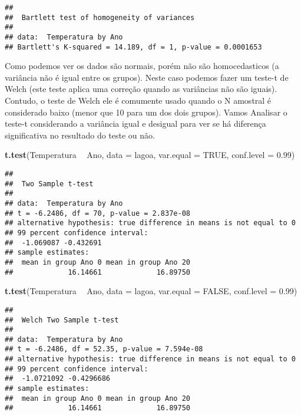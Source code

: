 \documentclass[14pt,titlepage, oneside, openany, a4paper]{book}
\newenvironment{Shaded}{\begin{snugshade}}{\end{snugshade}}
\newcommand{\DataTypeTok}[1]{\textcolor[rgb]{0.13,0.29,0.53}{#1}}
\newcommand{\FloatTok}[1]{\textcolor[rgb]{0.00,0.00,0.81}{#1}}
\newcommand{\KeywordTok}[1]{\textcolor[rgb]{0.13,0.29,0.53}{\textbf{#1}}}
\newcommand{\NormalTok}[1]{#1}
\newcommand{\OperatorTok}[1]{\textcolor[rgb]{0.81,0.36,0.00}{\textbf{#1}}}
\newcommand{\OtherTok}[1]{\textcolor[rgb]{0.56,0.35,0.01}{#1}}
\newcommand{\StringTok}[1]{\textcolor[rgb]{0.31,0.60,0.02}{#1}}
\begin{document}
\begin{verbatim}
## 
##  Bartlett test of homogeneity of variances
## 
## data:  Temperatura by Ano
## Bartlett's K-squared = 14.189, df = 1, p-value = 0.0001653
\end{verbatim}

Como podemos ver os dados são normais, porém não são homocedasticos (a variância não é igual entre os grupos). Neste caso podemos fazer um teste-t de Welch (este teste aplica uma correção quando as variâncias não são iguais). Contudo, o teste de Welch ele é comumente usado quando o N amostral é considerado baixo (menor que 10 para um dos dois grupos). Vamos Analisar o teste-t considerando a variância igual e desigual para ver se há diferença significativa no resultado do teste ou não.

\begin{Shaded}
\begin{Highlighting}[]
\KeywordTok{t.test}\NormalTok{(Temperatura }\OperatorTok{~}\StringTok{ }\NormalTok{Ano, }
       \DataTypeTok{data =}\NormalTok{ lagoa,}
       \DataTypeTok{var.equal =} \OtherTok{TRUE}\NormalTok{,}
       \DataTypeTok{conf.level =} \FloatTok{0.99}\NormalTok{)}
\end{Highlighting}
\end{Shaded}

\begin{verbatim}
## 
##  Two Sample t-test
## 
## data:  Temperatura by Ano
## t = -6.2486, df = 70, p-value = 2.837e-08
## alternative hypothesis: true difference in means is not equal to 0
## 99 percent confidence interval:
##  -1.069087 -0.432691
## sample estimates:
##  mean in group Ano 0 mean in group Ano 20 
##             16.14661             16.89750
\end{verbatim}

\begin{Shaded}
\begin{Highlighting}[]
\KeywordTok{t.test}\NormalTok{(Temperatura }\OperatorTok{~}\StringTok{ }\NormalTok{Ano, }
       \DataTypeTok{data =}\NormalTok{ lagoa,}
       \DataTypeTok{var.equal =} \OtherTok{FALSE}\NormalTok{,}
       \DataTypeTok{conf.level =} \FloatTok{0.99}\NormalTok{)}
\end{Highlighting}
\end{Shaded}

\begin{verbatim}
## 
##  Welch Two Sample t-test
## 
## data:  Temperatura by Ano
## t = -6.2486, df = 52.35, p-value = 7.594e-08
## alternative hypothesis: true difference in means is not equal to 0
## 99 percent confidence interval:
##  -1.0721092 -0.4296686
## sample estimates:
##  mean in group Ano 0 mean in group Ano 20 
##             16.14661             16.89750
\end{verbatim}
\end{document}

